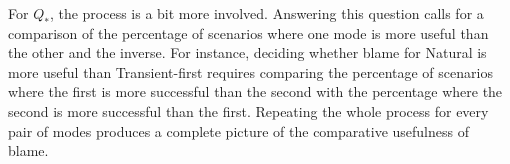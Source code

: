 For $Q_*$, the process is a bit more involved. Answering this question calls for
a comparison of the percentage of scenarios where one mode is more useful than
the other and the inverse.  For instance, deciding whether blame for Natural is
more useful than Transient-first requires comparing the percentage
of scenarios where the first is more successful than the second with
the percentage where the second is more successful than the first. Repeating the whole process
for every pair of modes produces a
complete picture of the comparative usefulness of blame. %


